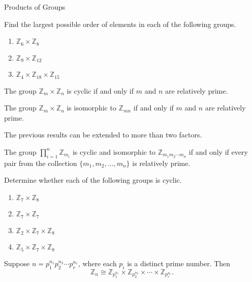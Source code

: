 \begin{section}{Products of Groups}
\begin{problem}
Find the largest possible order of elements in each of the following groups.
\begin{enumerate}[label=\textrm{(\alph*)}]
\item $\mathbb{Z}_6\times \mathbb{Z}_8$
\item $\mathbb{Z}_9\times \mathbb{Z}_{12}$
\item $\mathbb{Z}_4\times \mathbb{Z}_{18}\times \mathbb{Z}_{15}$
\end{enumerate}
\end{problem}

\begin{theorem}
The group $\mathbb{Z}_m\times \mathbb{Z}_n$ is cyclic if and only if $m$ and $n$ are relatively prime.
\end{theorem}

\begin{corollary}
The group $\mathbb{Z}_m\times \mathbb{Z}_n$ is isomorphic to $\mathbb{Z}_{mn}$ if and only if $m$ and $n$ are relatively prime.
\end{corollary}

The previous results can be extended to more than two factors.

\begin{theorem}
The group $\prod_{i=1}^n \mathbb{Z}_{m_i}$ is cyclic and isomorphic to $\mathbb{Z}_{m_1m_2\cdots m_n}$ if and only if every pair from the collection $\{m_1,m_2,\ldots, m_n\}$ is relatively prime.
\end{theorem}

\begin{problem}
Determine whether each of the following groups is cyclic.
\begin{enumerate}[label=\textrm{(\alph*)}]
\item $\mathbb{Z}_7\times \mathbb{Z}_8$
\item $\mathbb{Z}_7\times \mathbb{Z}_7$
\item $\mathbb{Z}_2\times \mathbb{Z}_7\times \mathbb{Z}_8$
\item $\mathbb{Z}_5\times \mathbb{Z}_7\times \mathbb{Z}_8$
\end{enumerate}
\end{problem}

\begin{theorem}
Suppose $n=p_1^{n_1}p_2^{n_2}\cdots p_r^{n_r}$, where each $p_i$ is a distinct prime number.  Then
\[
\mathbb{Z}_n\cong \mathbb{Z}_{p_1^{n_1}}\times \mathbb{Z}_{p_2^{n_2}}\times \cdots \times \mathbb{Z}_{p_r^{n_r}}.
\]
\end{theorem}


\end{section}
